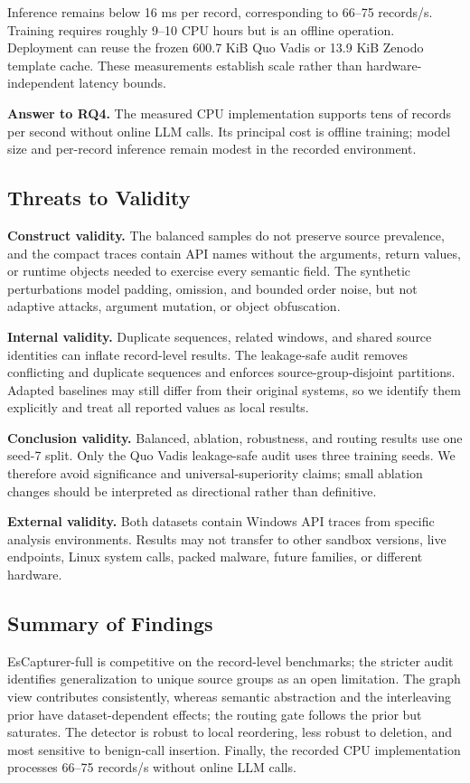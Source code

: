 Inference remains below 16 ms per record, corresponding to 66--75 records/s.
Training requires roughly 9--10 CPU hours but is an offline operation.
Deployment can reuse the frozen 600.7 KiB Quo Vadis or 13.9 KiB Zenodo
template cache.  These measurements establish scale rather than
hardware-independent latency bounds.

\noindent\textbf{Answer to RQ4.}
The measured CPU implementation supports tens of records per second without
online LLM calls.  Its principal cost is offline training; model size and
per-record inference remain modest in the recorded environment.

\subsection{Threats to Validity}
\label{sec:eval-threats}

\textbf{Construct validity.}
The balanced samples do not preserve source prevalence, and the compact traces
contain API names without the arguments, return values, or runtime objects
needed to exercise every semantic field.  The synthetic perturbations model
padding, omission, and bounded order noise, but not adaptive attacks, argument
mutation, or object obfuscation.

\textbf{Internal validity.}
Duplicate sequences, related windows, and shared source identities can inflate
record-level results.  The leakage-safe audit removes conflicting and duplicate
sequences and enforces source-group-disjoint partitions.  Adapted baselines may
still differ from their original systems, so we identify them explicitly and
treat all reported values as local results.

\textbf{Conclusion validity.}
Balanced, ablation, robustness, and routing results use one seed-7 split.
Only the Quo Vadis leakage-safe audit uses three training seeds.  We therefore
avoid significance and universal-superiority claims; small ablation changes
should be interpreted as directional rather than definitive.

\textbf{External validity.}
Both datasets contain Windows API traces from specific analysis environments.
Results may not transfer to other sandbox versions, live endpoints, Linux
system calls, packed malware, future families, or different hardware.

\subsection{Summary of Findings}
\label{sec:eval-summary}

EsCapturer-full is competitive on the record-level benchmarks; the stricter
audit identifies generalization to unique source groups as an open limitation.
The graph view contributes consistently, whereas semantic abstraction and the
interleaving prior have dataset-dependent effects; the routing gate follows
the prior but saturates.  The detector is robust to local reordering, less
robust to deletion, and most sensitive to benign-call insertion.  Finally,
the recorded CPU implementation processes 66--75 records/s without online
LLM calls.

\FloatBarrier
